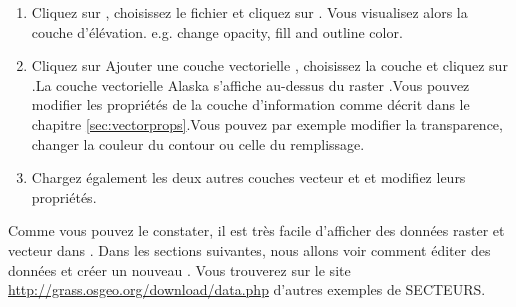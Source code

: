 \begin{enumerate}
  \item Cliquez sur , 
  choisissez le fichier  et cliquez sur . 
  Vous visualisez alors la couche d'élévation.
  e.g. change opacity, fill and outline color.
  \item Cliquez sur  {Ajouter une couche vectorielle \grass}, choisissez la couche  et cliquez sur .La couche vectorielle Alaska s'affiche au-dessus du raster .Vous pouvez modifier les propriétés de la couche d'information comme décrit dans le chapitre \ref{sec:vectorprops}.Vous pouvez par exemple modifier la transparence, changer la couleur du contour ou celle du remplissage.
  \item Chargez également les deux autres couches vecteur  et  et modifiez leurs propriétés.
\end{enumerate}

Comme vous pouvez le constater, il est très facile d'afficher des données \grass raster et vecteur dans \qg.  Dans les sections suivantes, nous allons voir comment éditer des données \grass et créer un nouveau .  Vous trouverez sur le site \grass \url{http://grass.osgeo.org/download/data.php} d'autres exemples de SECTEURS.

